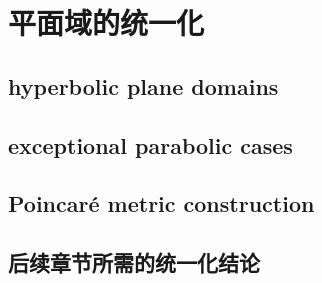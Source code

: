 \section{平面域的统一化}
\label{b3:sec:1204}


\subsection{hyperbolic plane domains}
\label{b3:subsec:120401}

\subsection{exceptional parabolic cases}
\label{b3:subsec:120402}

\subsection{Poincaré metric construction}
\label{b3:subsec:120403}

\subsection{后续章节所需的统一化结论}
\label{b3:subsec:120404}


